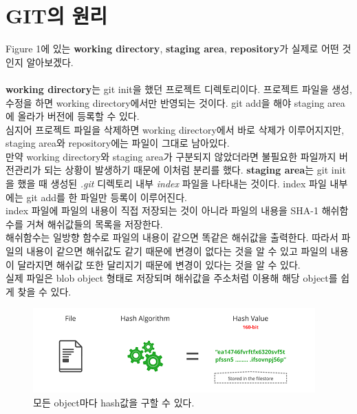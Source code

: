 \documentclass[letterpaper,12pt]{article}
\begin{document}
\section{GIT의 원리}
Figure 1에 있는 \textbf{working directory}, \textbf{staging area}, \textbf{repository}가 실제로 어떤 것인지 알아보겠다.
\\\\\textbf{working directory}는 git init을 했던 프로젝트 디렉토리이다. 프로젝트 파일을 생성, 수정을 하면 working directory에서만 반영되는 것이다. git add을 해야 staging area에 올라가 버전에 등록할 수 있다. 
\\심지어 프로젝트 파일을 삭제하면 working directory에서 바로 삭제가 이루어지지만, staging area와 repository에는 파일이 그대로 남아있다. \\만약 working directory와 staging area가 구분되지 않았더라면 불필요한 파일까지 버전관리가 되는 상황이 발생하기 때문에 이처럼 분리를 했다.
\clearpage
\textbf{staging area}는 git init을 했을 때 생성된 \textit{.git} 디렉토리 내부 \textit{index} 파일을 나타내는 것이다. index 파일 내부에는 git add를 한 파일만 등록이 이루어진다. \\index 파일에 파일의 내용이 직접 저장되는 것이 아니라 파일의 내용을 SHA-1 해쉬함수를 거쳐 해쉬값들의 목록을 저장한다. \\해쉬함수는 일방향 함수로 파일의 내용이 같으면 똑같은 해쉬값을 출력한다. 따라서 파일의 내용이 같으면 해쉬값도 같기 때문에 변경이 없다는 것을 알 수 있고 파일의 내용이 달라지면 해쉬값 또한 달리지기 때문에 변경이 있다는 것을 알 수 있다. \\ 실제 파일은 blob object 형태로 저장되며 해쉬값을 주소처럼 이용해 해당 object를 쉽게 찾을 수 있다.
\begin{figure}[ht] 
        \centering \includegraphics[width=0.8\columnwidth]{hash}
         \caption{
                \label{fig:hash}  
                모든 object마다 hash값을 구할 수 있다.
        }
\end{figure}
\end{document}
